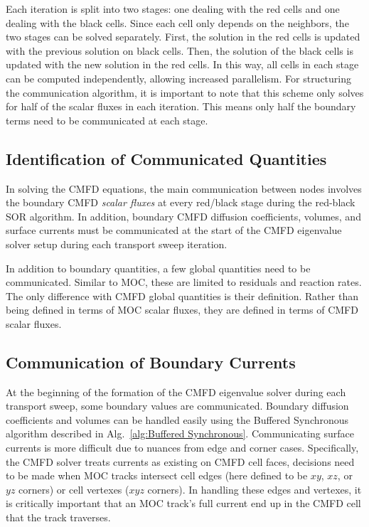 Each iteration is split into two stages: one dealing with the red cells and one dealing with the black cells. Since each cell only depends on the neighbors, the two stages can be solved separately. First, the solution in the red cells is updated with the previous solution on black cells. Then, the solution of the black cells is updated with the new solution in the red cells. In this way, all cells in each stage can be computed independently, allowing increased parallelism. For structuring the communication algorithm, it is important to note that this scheme only solves for half of the scalar fluxes in each iteration. This means only half the boundary terms need to be communicated at each stage.

\subsection{Identification of Communicated Quantities}

In solving the \ac{CMFD} equations, the main communication between nodes involves the boundary \ac{CMFD} \textit{scalar fluxes} at every red/black stage during the red-black SOR algorithm. In addition, boundary \ac{CMFD} diffusion coefficients, volumes, and surface currents must be communicated at the start of the \ac{CMFD} eigenvalue solver setup during each transport sweep iteration.

In addition to boundary quantities, a few global quantities need to be communicated. Similar to \ac{MOC}, these are limited to residuals and reaction rates. The only difference with \ac{CMFD} global quantities is their definition. Rather than being defined in terms of \ac{MOC} scalar fluxes, they are defined in terms of \ac{CMFD} scalar fluxes.


\subsection{Communication of Boundary Currents}

At the beginning of the formation of the \ac{CMFD} eigenvalue solver during each transport sweep, some boundary values are communicated. Boundary diffusion coefficients and volumes can be handled easily using the Buffered Synchronous algorithm described in Alg.~\ref{alg:Buffered Synchronous}. Communicating surface currents is more difficult due to nuances from edge and corner cases. Specifically, the \ac{CMFD} solver treats currents as existing on CMFD cell faces, decisions need to be made when \ac{MOC} tracks intersect cell edges (here defined to be $xy$, $xz$, or $yz$ corners) or cell vertexes ($xyz$ corners). In handling these edges and vertexes, it is critically important that an \ac{MOC} track's full current end up in the CMFD cell that the track traverses.

